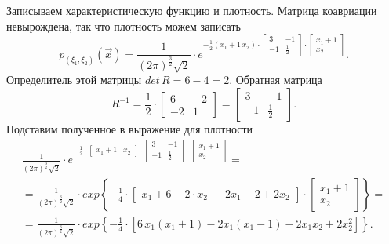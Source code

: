 \begin{enumerate}[label=\alph*)]
  Записываем характеристическую функцию и плотность.
  Матрица коавриации невырождена, так что плотность можем записать
  $$p_{ \left( \xi_1, \xi_2 \right) } \left( \vec{x} \right) =
    \frac{1}{ \left( 2 \pi \right)^{ \frac{3}{2}} \sqrt{2}} \cdot
    e^{- \frac{1}{2} \left( x_1 + 1 \, x_2 \right) \cdot
      \begin{bmatrix}
        3 & -1 \\
        -1 & \frac{1}{2}
      \end{bmatrix} \cdot
      \begin{bmatrix}
        x_1 + 1 \\
        x_2
      \end{bmatrix}
    }.$$
  Определитель этой матрицы $det \, R = 6 - 4 = 2$.
  Обратная матрица
  $$R^{-1} =
    \frac{1}{2} \cdot
    \begin{bmatrix}
      6 & -2 \\
      -2 & 1
    \end{bmatrix} =
    \begin{bmatrix}
      3 & -1 \\
      -1 & \frac{1}{2}
    \end{bmatrix}.$$
  Подставим полученное в выражение для плотности
  \begin{equation*}
    \begin{split}
      \frac{1}{ \left( 2 \pi \right)^{ \frac{3}{2}} \sqrt{2}} \cdot
      e^{- \frac{1}{2} \cdot
        \begin{bmatrix}
          x_1 + 1 & x_2
        \end{bmatrix} \cdot
        \begin{bmatrix}
          3 & -1 \\
          -1 & \frac{1}{2}
        \end{bmatrix} \cdot
        \begin{bmatrix}
          x_1 + 1 \\
          x_2
        \end{bmatrix}
      } = \\
      = \frac{1}{ \left( 2 \pi \right)^{ \frac{3}{2}} \sqrt{2}} \cdot
      exp \left\{
        - \frac{1}{4} \cdot
        \begin{bmatrix}
          x_1 + 6 - 2 \cdot x_2 & -2x_1 - 2 + 2x_2
        \end{bmatrix} \cdot
        \begin{bmatrix}
          x_1 + 1 \\
          x_2
        \end{bmatrix}
      \right\} = \\
      = \frac{1}{ \left( 2 \pi \right)^{ \frac{3}{2}} \sqrt{2}} \cdot
      exp \left\{
        - \frac{1}{4} \cdot
        \left[
          6 \, x_1 \left( x_1 + 1 \right) - 2x_1 \left( x_1 - 1 \right) - 2x_1 x_2 + 2x_2^2
        \right]
      \right\}.
    \end{split}
  \end{equation*}


\end{enumerate}
